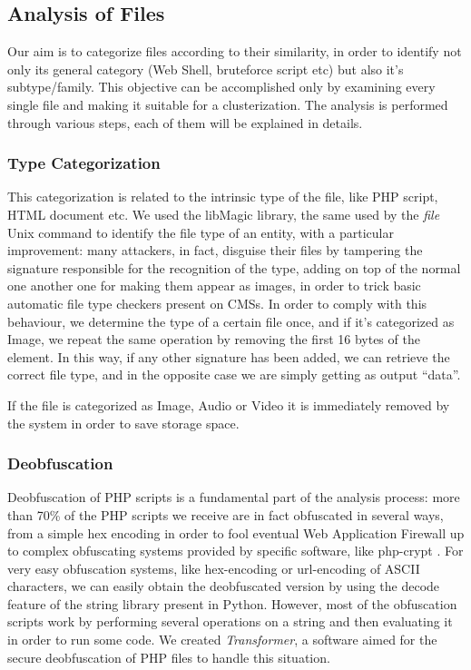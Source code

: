 \subsection{Analysis of Files}

Our aim is to categorize files according to their similarity, in order to identify not only its general category (Web Shell, bruteforce script etc) but also it's subtype/family. This objective can be accomplished only by examining every single file and making it suitable for a clusterization.
The analysis is performed through various steps, each of them will be explained in details.

\subsubsection{Type Categorization}
This categorization is related to the intrinsic type of the file, like PHP script, HTML document etc.
We used the libMagic \cite{libmagic} library, the same used by the \emph{file} Unix command to identify the file type of an entity, with a particular improvement: many attackers, in fact, disguise their files by tampering the signature responsible for the recognition of the type, adding on top of the normal one another one for making them appear as images, in order to trick basic automatic file type checkers present on CMSs. In order to comply with this behaviour, we determine the type of a certain file once, and if it's categorized as Image, we repeat the same operation by removing the first 16 bytes of the element. In this way, if any other signature has been added, we can retrieve the correct file type, and in the opposite case we are simply getting as output ``data''.

If the file is categorized as Image, Audio or Video it is immediately removed by the system in order to save storage space.

\subsubsection{Deobfuscation}
Deobfuscation of PHP scripts is a fundamental part of the analysis process: more than 70\% of the PHP scripts we receive are in fact obfuscated in several ways, from a simple hex encoding in order to fool eventual Web Application Firewall up to complex obfuscating systems provided by specific software, like php-crypt \cite{phpcrypt}.
For very easy obfuscation systems, like hex-encoding or url-encoding of ASCII characters, we can easily obtain the deobfuscated version by using the decode feature of the string library present in Python.
However, most of the obfuscation scripts work by performing several operations on a string and then evaluating it in order to run some code. We created \emph{Transformer}, a software aimed for the secure deobfuscation of PHP files to handle this situation.

